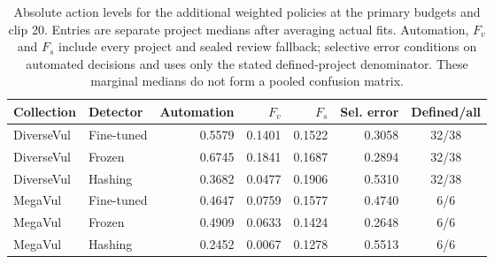 \begin{table}[htbp]\centering\small
\caption{Absolute action levels for the additional weighted policies at the primary budgets and clip 20. Entries are separate project medians after averaging actual fits. Automation, $F_v$ and $F_s$ include every project and sealed review fallback; selective error conditions on automated decisions and uses only the stated defined-project denominator. These marginal medians do not form a pooled confusion matrix.}
\label{tab:newactions}
\begin{tabular}{@{}llrrrrc@{}}\toprule Collection & Detector & Automation & $F_v$ & $F_s$ & Sel. error & Defined/all\\\midrule
DiverseVul & Fine-tuned & 0.5579 & 0.1401 & 0.1522 & 0.3058 & 32/38\\
DiverseVul & Frozen & 0.6745 & 0.1841 & 0.1687 & 0.2894 & 32/38\\
DiverseVul & Hashing & 0.3682 & 0.0477 & 0.1906 & 0.5310 & 32/38\\
MegaVul & Fine-tuned & 0.4647 & 0.0759 & 0.1577 & 0.4740 & 6/6\\
MegaVul & Frozen & 0.4909 & 0.0633 & 0.1424 & 0.2648 & 6/6\\
MegaVul & Hashing & 0.2452 & 0.0067 & 0.1278 & 0.5513 & 6/6\\
\bottomrule\end{tabular}\end{table}

